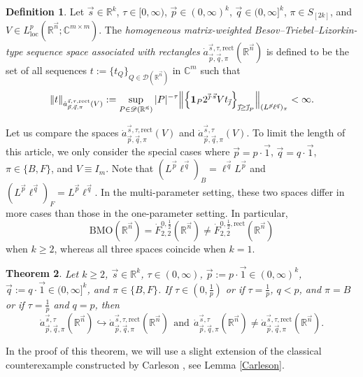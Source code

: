 \documentclass[11pt, reqno]{amsart}
\newtheorem{theorem}{Theorem}[section]
\theoremstyle{definition}
\newtheorem{definition}[theorem]{Definition}
\theoremstyle{remark}
\numberwithin{equation}{section}
\newcommand{\R}{\mathbb R}
\newcommand{\vj}{\vec{\textit{\j}}}
\newcommand{\one}{\mathbf{1}}
\begin{document}
\begin{definition}
Let $\vec s\in\mathbb R^k$, $\tau\in[0,\infty)$,
$\vec p\in(0,\infty)^k$, $\vec q\in(0,\infty]^k$, $\pi\in S_{[2k]}$,
and $V\in L^p_{\mathrm{loc}}(\mathbb R^{\vec n};\mathbb C^{m\times m})$.
The \emph{homogeneous matrix-weighted Besov--Triebel--Lizorkin-type sequence space associated with rectangles}
$\dot a^{\vec s,\tau,\mathrm{rect}}_{\vec p,\vec q,\pi}(\mathbb R^{\vec n})$
is defined to be the set of all sequences
$t:=\{t_Q\}_{Q\in\mathscr D(\mathbb R^{\vec n})}$ in $\mathbb C^m$ such that
\begin{equation*}
\|t\|_{\dot a^{\vec s,\tau,\mathrm{rect}}_{\vec p,\vec q,\pi}(V)}
:=\sup_{P\in\mathscr D(\R^{\vec n})} |P|^{-\tau}
\Big\|\Big\{\one_P 2^{\vj\cdot\vec s}
V t_{\vj}\Big\}_{\vj\geq {\vj}_P}\Big\|_{(L^{\vec p}\ell^{\vec q})_{\pi}}
<\infty.
\end{equation*}
\end{definition}

Let us compare the spaces $\dot a^{\vec s,\tau,\mathrm{rect}}_{\vec p,\vec q,\pi}(V)$
and $\dot a^{\vec s,\tau}_{\vec p,\vec q,\pi}(V)$.
To limit the length of this article, we only consider the special cases
where $\vec p=p\cdot \vec 1$, $\vec q=q\cdot \vec 1$,
$\pi \in \{B,F\}$, and $V\equiv I_m$.
Note that $(L^{\vec p}\ell^{\vec q})_{B}=\ell^{\vec q}L^{\vec p}$ and $(L^{\vec p}\ell^{\vec q})_{F}=L^{\vec p}\ell^{\vec q}$.
In the multi-parameter setting, these two spaces differ in more cases than those in the one-parameter setting.
In particular,
$$
\mathrm{BMO}(\mathbb R^{\vec n})
=\dot F^{0,\frac12}_{2,2}(\mathbb R^{\vec n})
\neq \dot F^{0,\frac12,\mathrm{rect}}_{2,2}(\mathbb R^{\vec n})
$$
when $k\geq2$, whereas all three spaces coincide when $k=1$.

\begin{theorem} \label{compare B}
Let $k\geq 2$, $\vec s\in\mathbb R^k$, $\tau\in(0,\infty)$,
$\vec p:=p\cdot \vec 1\in(0,\infty)^k$,
$\vec q:=q\cdot \vec 1\in(0,\infty]^k$, and $\pi \in \{B,F\}$.
If $\tau\in(0,\frac1p)$
or if $\tau=\frac1p$, $q< p$, and $\pi=B$
or if $\tau=\frac1p$ and $q= p$, then
$$
\dot a^{\vec s,\tau}_{\vec p,\vec q,\pi}(\mathbb R^{\vec n})
\hookrightarrow
\dot a^{\vec s,\tau,\mathrm{rect}}_{\vec p,\vec q,\pi}(\mathbb R^{\vec n})
\ \ \text{and}\ \
\dot a^{\vec s,\tau}_{\vec p,\vec q,\pi}(\mathbb R^{\vec n})
\neq \dot a^{\vec s,\tau,\mathrm{rect}}_{\vec p,\vec q,\pi}(\mathbb R^{\vec n}).
$$
\end{theorem}

In the proof of this theorem, we will use a slight extension of the classical counterexample constructed by Carleson \cite{Car}, see Lemma \ref{Carleson}.
\end{document}
